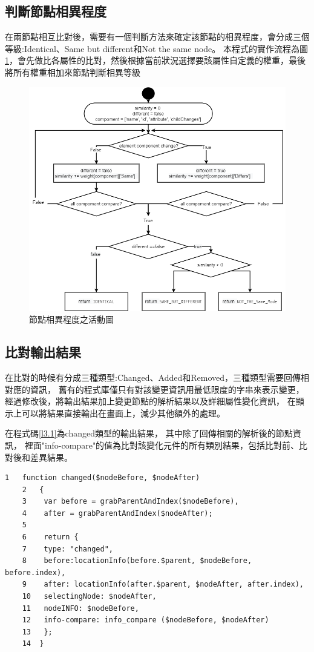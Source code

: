 \subsection{判斷節點相異程度}\label{s3.2.1}
在兩節點相互比對後，需要有一個判斷方法來確定該節點的相異程度，會分成三個等級:Identical、Same but different和Not the same node。
本程式的實作流程為圖\ref{f3.3}，會先做比各屬性的比對，然後根據當前狀況選擇要該屬性自定義的權重，最後將所有權重相加來節點判斷相異等級

\begin{figure}[H]
    \centering
    \includegraphics[width=1.0\textwidth]{picture/ch3_HEURISTIC_comapre.png}
    \caption{節點相異程度之活動圖}
    \label{f3.3}
\end{figure}

\subsection{比對輸出結果}\label{s3.2.2}
在比對的時候有分成三種類型:Changed、Added和Removed，三種類型需要回傳相對應的資訊，
舊有的程式庫僅只有對該變更資訊用最低限度的字串來表示變更，經過修改後，將輸出結果加上變更節點的解析結果以及詳細屬性變化資訊，
在顯示上可以將結果直接輸出在畫面上，減少其他額外的處理。

在程式碼\ref{l3.1}為changed類型的輸出結果，
其中除了回傳相關的解析後的節點資訊，
裡面"info-compare"的值為比對該變化元件的所有類別結果，包括比對前、比對後和差異結果。

\begin{lstlisting}[caption=比對輸出結果(changed類型), label={l3.1}]
    1   function changed($nodeBefore, $nodeAfter) 
    2   {
    3    var before = grabParentAndIndex($nodeBefore),
    4    after = grabParentAndIndex($nodeAfter);
    5
    6    return {
    7    type: "changed",
    8    before:locationInfo(before.$parent, $nodeBefore, before.index),
    9    after: locationInfo(after.$parent, $nodeAfter, after.index),
    10   selectingNode: $nodeAfter,
    11   nodeINFO: $nodeBefore,
    12   info-compare: info_compare ($nodeBefore, $nodeAfter)
    13   };
    14  }
\end{lstlisting}

